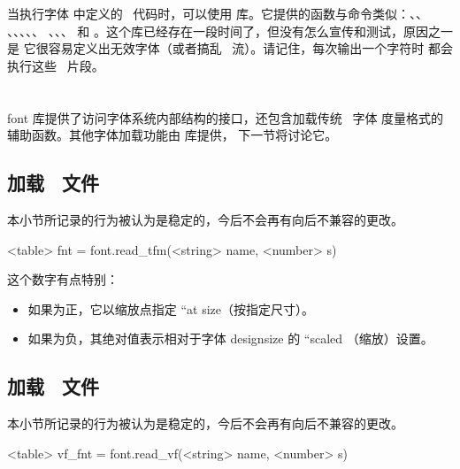 当执行字体  中定义的 \LUA\ 代码时，可以使用
 库。它提供的函数与命令类似：、、
、、、、、
、、、 和
。这个库已经存在一段时间了，但没有怎么宣传和测试，原因之一是
它很容易定义出无效字体（或者搞乱 \PDF\ 流）。请记住，每次输出一个字符时
都会执行这些 \LUA\ 片段。

\section{}


font 库提供了访问字体系统内部结构的接口，还包含加载传统 \TEX\ 字体
度量格式的辅助函数。其他字体加载功能由  库提供，
下一节将讨论它。

\subsection{加载 \TFM\ 文件}


本小节所记录的行为被认为是稳定的，今后不会再有向后不兼容的更改。

\begin{typing}
<table> fnt =
    font.read_tfm(<string> name, <number> s)
\end{typing}

这个数字有点特别：

\begin{itemize}\item 如果为正，它以缩放点指定 ``at size（按指定尺寸）。

\item 如果为负，其绝对值表示相对于字体 designsize 的 ``scaled
    （缩放）设置。

\end{itemize}

\subsection{加载 \VF\ 文件}


本小节所记录的行为被认为是稳定的，今后不会再有向后不兼容的更改。

\begin{typing}
<table> vf_fnt =
    font.read_vf(<string> name, <number> s)
\end{typing}

